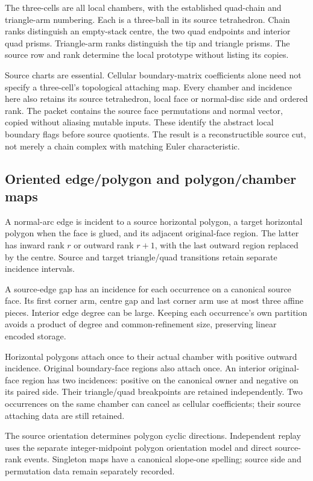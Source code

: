 The three-cells are all local chambers, with the established quad-chain and
triangle-arm numbering. Each is a three-ball in its source tetrahedron.
Chain ranks distinguish an empty-stack centre, the two quad endpoints and
interior quad prisms. Triangle-arm ranks distinguish the tip and triangle
prisms. The source row and rank determine the local prototype without
listing its copies.

Source charts are essential. Cellular boundary-matrix coefficients alone
need not specify a three-cell's topological attaching map. Every chamber
and incidence here also retains its source tetrahedron, local face or
normal-disc side and ordered rank. The packet contains the source face
permutations and normal vector, copied without aliasing mutable inputs.
These identify the abstract local boundary flags before source quotients.
The result is a reconstructible source cut, not merely a chain complex
with matching Euler characteristic.

\subsection{Oriented edge/polygon and polygon/chamber maps}

A normal-arc edge is incident to a source horizontal polygon, a target
horizontal polygon when the face is glued, and its adjacent original-face
region. The latter has inward rank $r$ or outward rank $r+1$, with the last
outward region replaced by the centre. Source and target triangle/quad
transitions retain separate incidence intervals.

A source-edge gap has an incidence for each occurrence on a canonical
source face. Its first corner arm, centre gap and last corner arm use at
most three affine pieces. Interior edge degree can be large. Keeping each
occurrence's own partition avoids a product of degree and common-refinement
size, preserving linear encoded storage.

Horizontal polygons attach once to their actual chamber with positive
outward incidence. Original boundary-face regions also attach once. An
interior original-face region has two incidences: positive on the canonical
owner and negative on its paired side. Their triangle/quad breakpoints
are retained independently. Two occurrences on the same chamber can cancel
as cellular coefficients; their source attaching data are still retained.

The source orientation determines polygon cyclic directions. Independent
replay uses the separate integer-midpoint polygon orientation model and
direct source-rank events. Singleton maps have a canonical slope-one
spelling; source side and permutation data remain separately recorded.

